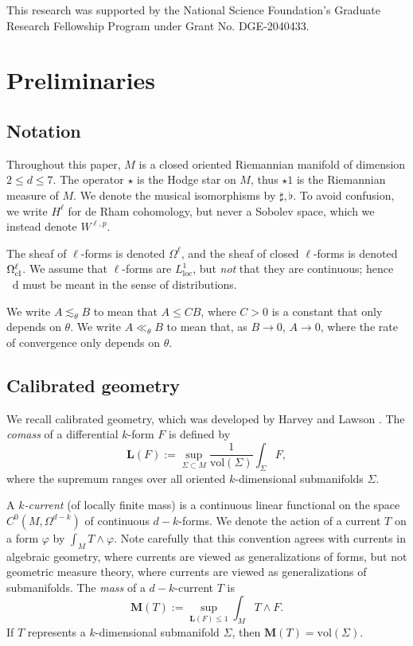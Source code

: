 \documentclass[reqno,11pt]{amsart}
\newcommand*\dif{\mathop{}\!\mathrm{d}}
\newcommand{\vol}{\mathrm{vol}}
\newcommand{\Mass}{\mathbf M}
\newcommand{\Comass}{\mathbf L}
\newcommand{\dfn}[1]{\emph{#1}\index{#1}}
\newcommand{\loc}{\mathrm{loc}}
\theoremstyle{definition}
\numberwithin{equation}{section}
\begin{document}
This research was supported by the National Science Foundation's Graduate Research Fellowship Program under Grant No. DGE-2040433.

\section{Preliminaries}\label{prevResults}
\subsection{Notation}
Throughout this paper, $M$ is a closed oriented Riemannian manifold of dimension $2 \leq d \leq 7$.
The operator $\star$ is the Hodge star on $M$, thus $\star 1$ is the Riemannian measure of $M$.
We denote the musical isomorphisms by $\sharp, \flat$.
To avoid confusion, we write $H^\ell$ for de Rham cohomology, but never a Sobolev space, which we instead denote $W^{\ell, p}$.

The sheaf of $\ell$-forms is denoted $\Omega^\ell$, and the sheaf of closed $\ell$-forms is denoted $\Omega^\ell_{\rm cl}$.
We assume that $\ell$-forms are $L^1_\loc$, but \emph{not} that they are continuous; hence $\dif$ must be meant in the sense of distributions.

We write $A \lesssim_\theta B$ to mean that $A \leq CB$, where $C > 0$ is a constant that only depends on $\theta$.
We write $A \ll_\theta B$ to mean that, as $B \to 0$, $A \to 0$, where the rate of convergence only depends on $\theta$.

\subsection{Calibrated geometry}
We recall calibrated geometry, which was developed by Harvey and Lawson \cite{Harvey82}.
The \dfn{comass} of a differential $k$-form $F$ is defined by 
$$\Comass(F) := \sup_{\Sigma \subset M} \frac{1}{\vol(\Sigma)} \int_\Sigma F,$$
where the supremum ranges over all oriented $k$-dimensional submanifolds $\Sigma$.

A \dfn{$k$-current} (of locally finite mass) is a continuous linear functional on the space $C^0(M, \Omega^{d - k})$ of continuous $d - k$-forms.
We denote the action of a current $T$ on a form $\varphi$ by $\int_M T \wedge \varphi$.
Note carefully that this convention agrees with currents in algebraic geometry, where currents are viewed as generalizations of forms, but not geometric measure theory, where currents are viewed as generalizations of submanifolds.
The \dfn{mass} of a $d - k$-current $T$ is
$$\Mass(T) := \sup_{\Comass(F) \leq 1} \int_M T \wedge F.$$
If $T$ represents a $k$-dimensional submanifold $\Sigma$, then $\Mass(T) = \vol(\Sigma)$.
\end{document}
